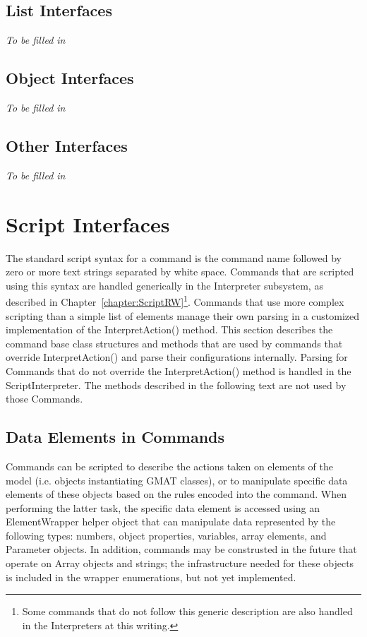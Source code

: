 \subsection{List Interfaces}

\textit{To be filled in}

\subsection{Object Interfaces}

\textit{To be filled in}

\subsection{Other Interfaces}

\textit{To be filled in}

\section{Script Interfaces}

The standard script syntax for a command is the command name followed by zero or more text strings
separated by white space.  Commands that are scripted using this syntax are handled generically in
the Interpreter subsystem, as described in Chapter~\ref{chapter:ScriptRW}\footnote{Some commands
that do not follow this generic description are also handled in the Interpreters at this writing.}.
Commands that use more complex scripting than a simple list of elements manage their own parsing in
a customized implementation of the InterpretAction() method.  This section describes the command
base class structures and methods that are used by commands that override InterpretAction() and
parse their configurations internally.  Parsing for Commands that do not override the
InterpretAction() method is handled in the ScriptInterpreter.  The methods described in the
following text are not used by those Commands.

\subsection{\label{section:ParametersInCommands}Data Elements in Commands}

Commands can be scripted to describe the actions taken on elements of the model (i.e. objects
instantiating GMAT classes), or to manipulate specific data elements of these objects based on the
rules encoded into the command.  When performing the latter task, the specific data element is
accessed using an ElementWrapper helper object that can manipulate data represented by the
following types: numbers, object properties, variables, array elements, and Parameter objects.  In
addition, commands may be construsted in the future that operate on Array objects and strings; the
infrastructure needed for these objects is included in the wrapper enumerations, but not yet
implemented.


